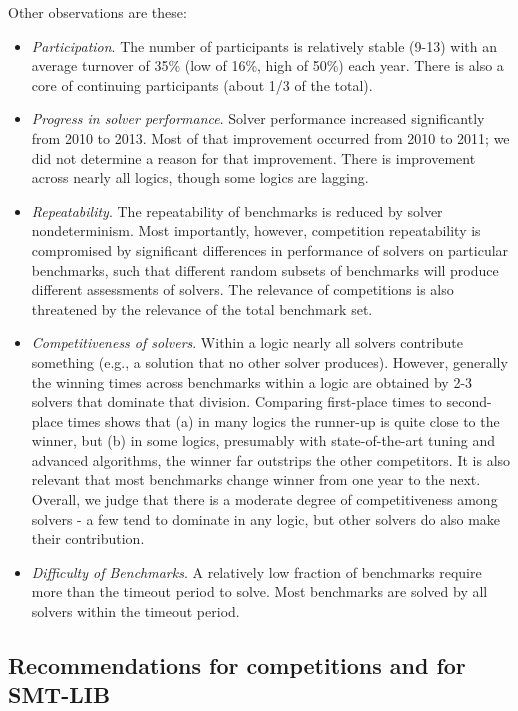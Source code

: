 \documentclass[smallcondensed]{svjour3}
\begin{document}
Other observations are these:
\begin{itemize}
\item {\em Participation}. The number of participants is relatively stable (9-13) with an average turnover of 35\% (low of 16\%, high of 50\%) each year. There is also a core of continuing participants (about 1/3 of the total).
\item {\em Progress in solver performance}. Solver performance increased significantly from 2010 to 2013. 
Most of that improvement occurred from 2010 to 2011; we did not determine a reason for that improvement. There is improvement across nearly all logics, though some logics are lagging.  
\item {\em Repeatability}. The repeatability of benchmarks is reduced by solver nondeterminism. Most importantly, however, competition repeatability is compromised by significant differences in performance of solvers on particular benchmarks, such that different random subsets of benchmarks will produce different assessments of solvers. The relevance of competitions is also threatened by the relevance of the total benchmark set.
\item {\em Competitiveness of solvers}. Within a logic nearly all solvers contribute something (e.g., a solution that no other solver produces). However, generally the winning times across benchmarks within a logic are obtained by 2-3 solvers that dominate that division. Comparing first-place times to second-place times shows that (a) in many logics the runner-up is quite close to the winner, but (b) in some logics, presumably with state-of-the-art tuning and advanced algorithms, the winner far outstrips the other competitors. It is also relevant that most benchmarks change winner from one year to the next. Overall, we judge that there is a moderate degree of competitiveness among solvers - a few tend to dominate in any logic, but other solvers do also make their contribution.
\item {\em Difficulty of Benchmarks}. A relatively low fraction of benchmarks require more than the timeout period to solve. Most benchmarks are solved by all solvers within the timeout period.

\end{itemize}

\subsection{Recommendations for competitions and for SMT-LIB}
\end{document}

